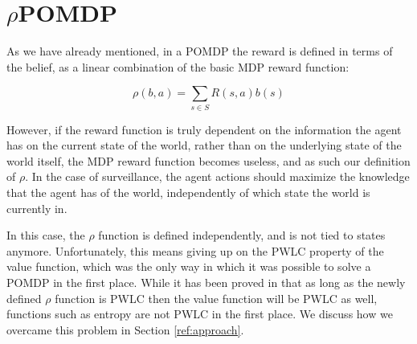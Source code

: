 %
%
%
%

\section{$\rho$POMDP}

As we have already mentioned, in a POMDP the reward is defined in terms of the belief, as a linear
combination of the basic MDP reward function:

\[ \rho(b,a) = \sum_{s\in S} R(s,a) b(s) \]

However, if the reward function is truly dependent on the information the agent has on the current
state of the world, rather than on the underlying state of the world itself, the MDP reward function
becomes useless, and as such our definition of $\rho$. In the case of surveillance, the agent
actions should maximize the knowledge that the agent has of the world, independently of which state
the world is currently in.

In this case, the $\rho$ function is defined independently, and is not tied to states anymore.
Unfortunately, this means giving up on the PWLC property of the value function, which was the only
way in which it was possible to solve a POMDP in the first place. While it has been proved in
\cite{cit:rpomdp} that as long as the newly defined $\rho$ function is PWLC then the value function
will be PWLC as well, functions such as entropy are not PWLC in the first place. We discuss how we
overcame this problem in Section \ref{ref:approach}.
